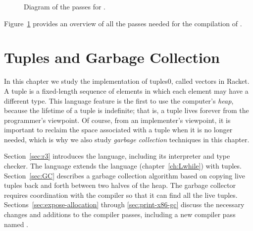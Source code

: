 \documentclass[7x10]{TimesAPriori_MIT}%
\def\racketEd{0}
\def\edition{1}
\newcommand{\racket}[1]{{\if\edition\racketEd{#1}\fi}}
\numberwithin{theorem}{chapter}
\numberwithin{definition}{chapter}
\numberwithin{equation}{chapter}
\begin{document}
\begin{figure}[tp]
\begin{tcolorbox}[colback=white]
{
\fi}
\end{tcolorbox}

\caption{Diagram of the passes for \LangLoop{}.}
\label{fig:Lwhile-passes}
\end{figure}

Figure~\ref{fig:Lwhile-passes} provides an overview of all the passes needed
for the compilation of \LangLoop{}.






\chapter{Tuples and Garbage Collection}
\label{ch:Lvec}
\setcounter{footnote}{0}

In this chapter we study the implementation of tuples\racket{, called
  vectors in Racket}.  A tuple is a fixed-length sequence of elements
in which each element may have a different type.
%
This language feature is the first to use the computer's
\emph{heap}, because the lifetime of a tuple is
indefinite; that is, a tuple lives forever from the programmer's
viewpoint. Of course, from an implementer's viewpoint, it is important
to reclaim the space associated with a tuple when it is no longer
needed, which is why we also study \emph{garbage collection}
 techniques in this chapter.

Section~\ref{sec:r3} introduces the \LangVec{} language, including its
interpreter and type checker. The \LangVec{} language extends the \LangLoop{}
language (chapter~\ref{ch:Lwhile}) with tuples.
%
Section~\ref{sec:GC} describes a garbage collection algorithm based on
copying live tuples back and forth between two halves of the heap. The
garbage collector requires coordination with the compiler so that it
can find all the live tuples.
%
Sections~\ref{sec:expose-allocation} through \ref{sec:print-x86-gc}
discuss the necessary changes and additions to the compiler passes,
including a new compiler pass named .
\end{document}
